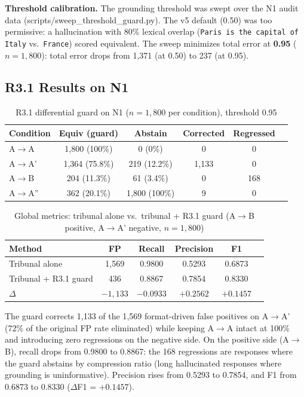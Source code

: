 \documentclass[11pt,a4paper]{article}
\begin{document}
\textbf{Threshold calibration.} The grounding threshold was swept over the N1 audit data (scripts/sweep\_threshold\_guard.py). The v5 default (0.50) was too permissive: a hallucination with 80\% lexical overlap (\texttt{Paris is the capital of Italy} vs.\ \texttt{France}) scored equivalent. The sweep minimizes total error at \textbf{0.95} ($n = 1{,}800$): total error drops from 1{,}371 (at 0.50) to 237 (at 0.95).

\subsection{R3.1 Results on N1}

\begin{table}[H]
\centering
\caption{R3.1 differential guard on N1 ($n = 1{,}800$ per condition), threshold 0.95}
\label{tab:r31-n1}
\begin{tabular}{@{}lccccc@{}}
\toprule
Condition & Equiv (guard) & Abstain & Corrected & Regressed \\
\midrule
A$\rightarrow$A   & 1{,}800 (100\%) & 0 (0\%)    & 0    & 0 \\
A$\rightarrow$A'  & 1{,}364 (75.8\%) & 219 (12.2\%) & 1{,}133 & 0 \\
A$\rightarrow$B   &   204 (11.3\%) & 61 (3.4\%)  & 0    & 168 \\
A$\rightarrow$A'' &   362 (20.1\%) & 1{,}800 (100\%) & 9 & 0 \\
\bottomrule
\end{tabular}
\end{table}

\begin{table}[H]
\centering
\caption{Global metrics: tribunal alone vs.\ tribunal + R3.1 guard (A$\rightarrow$B positive, A$\rightarrow$A' negative, $n = 1{,}800$)}
\label{tab:r31-global}
\begin{tabular}{@{}lccccc@{}}
\toprule
Method & FP & Recall & Precision & F1 \\
\midrule
Tribunal alone             & 1{,}569 & 0.9800 & 0.5293 & 0.6873 \\
Tribunal + R3.1 guard      &   436   & 0.8867 & 0.7854 & 0.8330 \\
\midrule
$\Delta$                   & $-1{,}133$ & $-0.0933$ & $+0.2562$ & $+0.1457$ \\
\bottomrule
\end{tabular}
\end{table}

The guard corrects 1{,}133 of the 1{,}569 format-driven false positives on A$\rightarrow$A' (72\% of the original FP rate eliminated) while keeping A$\rightarrow$A intact at 100\% and introducing zero regressions on the negative side. On the positive side (A$\rightarrow$B), recall drops from 0.9800 to 0.8867: the 168 regressions are responses where the guard abstains by compression ratio (long hallucinated responses where grounding is uninformative). Precision rises from 0.5293 to 0.7854, and F1 from 0.6873 to 0.8330 ($\Delta$F1 = $+0.1457$).
\end{document}
